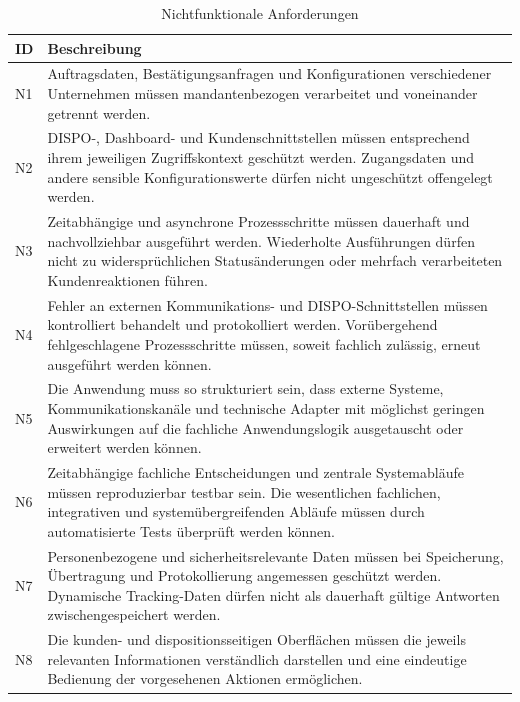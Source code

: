 \begin{table}[htbp]
    \centering
    \caption{Nichtfunktionale Anforderungen}
    \label{tab:nichtfunktionale-anforderungen}
    \begin{tabularx}{\textwidth}{@{}p{}X@{}}
        \toprule
        ID & Beschreibung \\
        \midrule
        N1 &
        Auftragsdaten, Bestätigungsanfragen und
        Konfigurationen verschiedener Unternehmen müssen
        mandantenbezogen verarbeitet und voneinander getrennt
        werden. \\

        N2 &
        DISPO-, Dashboard- und Kundenschnittstellen müssen
        entsprechend ihrem jeweiligen Zugriffskontext
        geschützt werden. Zugangsdaten und andere sensible
        Konfigurationswerte dürfen nicht ungeschützt
        offengelegt werden. \\

        N3 &
        Zeitabhängige und asynchrone Prozessschritte müssen
        dauerhaft und nachvollziehbar ausgeführt werden.
        Wiederholte Ausführungen dürfen nicht zu widersprüchlichen
        Statusänderungen oder mehrfach verarbeiteten
        Kundenreaktionen führen. \\

        N4 &
        Fehler an externen Kommunikations- und DISPO-Schnittstellen
        müssen kontrolliert behandelt und protokolliert werden.
        Vorübergehend fehlgeschlagene Prozessschritte müssen, soweit
        fachlich zulässig, erneut ausgeführt werden können. \\

        N5 &
        Die Anwendung muss so strukturiert sein, dass externe
        Systeme, Kommunikationskanäle und technische Adapter
        mit möglichst geringen Auswirkungen auf die fachliche
        Anwendungslogik ausgetauscht oder erweitert werden
        können. \\

        N6 &
        Zeitabhängige fachliche Entscheidungen und zentrale
        Systemabläufe müssen reproduzierbar testbar sein. Die
        wesentlichen fachlichen, integrativen und
        systemübergreifenden Abläufe müssen durch automatisierte Tests
        überprüft werden können. \\

        N7 &
        Personenbezogene und sicherheitsrelevante Daten müssen
        bei Speicherung, Übertragung und Protokollierung
        angemessen geschützt werden. Dynamische Tracking-Daten
        dürfen nicht als dauerhaft gültige Antworten
        zwischengespeichert werden. \\

        N8 &
        Die kunden- und dispositionsseitigen Oberflächen müssen
        die jeweils relevanten Informationen verständlich
        darstellen und eine eindeutige Bedienung der
        vorgesehenen Aktionen ermöglichen. \\
        \bottomrule
    \end{tabularx}
\end{table}
